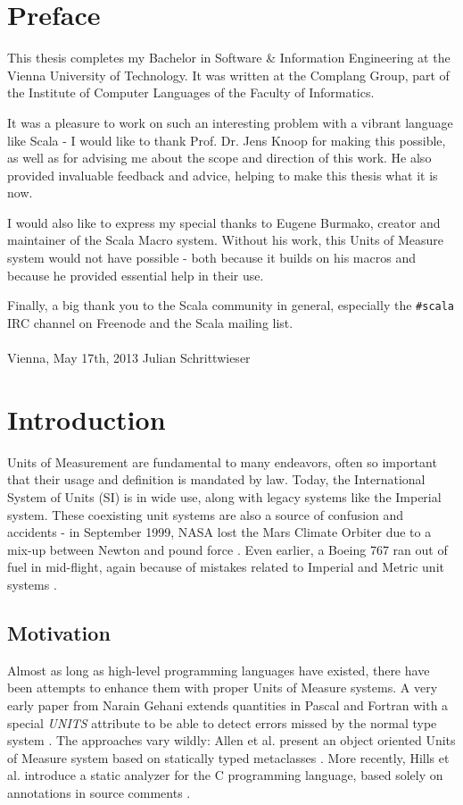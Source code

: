 \documentclass[12pt,oneside,a4paper]{scrbook}
\begin{document}
\chapter*{Preface}

This thesis completes my Bachelor in Software \& Information Engineering at the Vienna University of Technology. It was written at the Complang Group, part of the Institute of Computer Languages of the Faculty of Informatics.

It was a pleasure to work on such an interesting problem with a vibrant language like Scala - I would like to thank Prof. Dr. Jens Knoop for making this possible, as well as for advising me about the scope and direction of this work. He also provided invaluable feedback and advice, helping to make this thesis what it is now.

I would also like to express my special thanks to Eugene Burmako, creator and maintainer of the Scala Macro system. Without his work, this Units of Measure system would not have possible - both because it builds on his macros and because he provided essential help in their use.

Finally, a big thank you to the Scala community in general, especially the \verb|#scala| IRC channel on Freenode and the Scala mailing list.
\\ \\
Vienna, May 17th, 2013  \hfill Julian Schrittwieser

\singlespacing
\tableofcontents

\chapter{Introduction}
\setcounter{page}{1}

Units of Measurement are fundamental to many endeavors, often so important that their usage and definition is mandated by law. Today, the International System of Units (SI) is in wide use, along with legacy systems like the Imperial system. These coexisting unit systems are also a source of confusion and accidents - in September 1999, NASA lost the Mars Climate Orbiter due to a mix-up between Newton and pound force \citep{Nasa99}. Even earlier, a Boeing 767 ran out of fuel in mid-flight, again because of mistakes related to Imperial and Metric unit systems \citep{Witkin83}.


\section{Motivation}
Almost as long as high-level programming languages have existed, there have been attempts to enhance them with proper Units of Measure systems. A very early paper from Narain Gehani extends quantities in Pascal and Fortran with a special \emph{UNITS} attribute to be able to detect errors missed by the normal type system \citep{Gehani1977}. The approaches vary wildly: Allen et al. present an object oriented Units of Measure system based on statically typed metaclasses \citep{Allen04}.  More recently, Hills et al. introduce a static analyzer for the C programming language, based solely on annotations in source comments \citep{Hills2012}.
\end{document}
